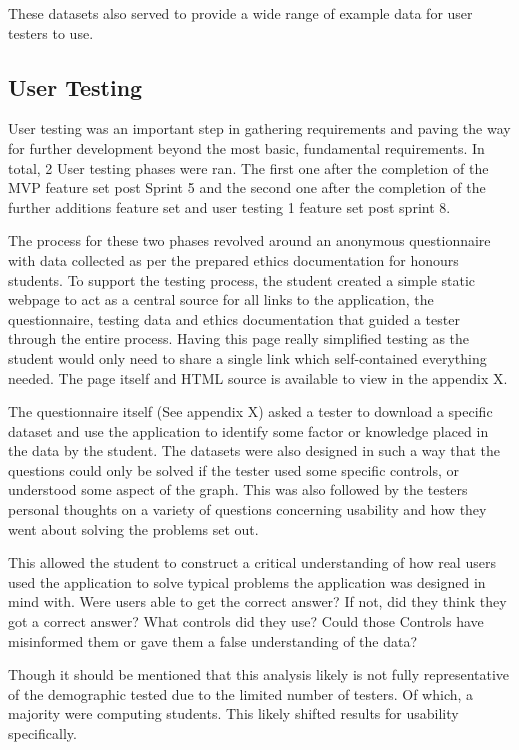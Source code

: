 These datasets also served to provide a wide range of example data for user testers to use.

\subsection{User Testing}
User testing was an important step in gathering requirements and paving the way for further development beyond the most basic, fundamental requirements. In total, 2 User testing phases were ran. The first one after the completion of the MVP feature set post Sprint 5 and the second one after the completion of the further additions feature set and user testing 1 feature set post sprint 8.

The process for these two phases revolved around an anonymous questionnaire with data collected as per the prepared ethics documentation for honours students.
To support the testing process, the student created a simple static webpage to act as a central source for all links to the application, the questionnaire, testing data and ethics documentation that guided a tester through the entire process. Having this page really simplified testing as the student would only need to share a single link which self-contained everything needed. The page itself and HTML source is available to view in the appendix X.

The questionnaire itself (See appendix X) asked a tester to download a specific dataset and use the application to identify some factor or knowledge placed in the data by the student. The datasets were also designed in such a way that the questions could only be solved if the tester used some specific controls, or understood some aspect of the graph. This was also followed by the testers personal thoughts on a variety of questions concerning usability and how they went about solving the problems set out.

This allowed the student to construct a critical understanding of how real users used the application to solve typical problems the application was designed in mind with. Were users able to get the correct answer? If not, did they think they got a correct answer? What controls did they use? Could those Controls have misinformed them or gave them a false understanding of the data?

Though it should be mentioned that this analysis likely is not fully representative of the demographic tested due to the limited number of testers. Of which, a majority were computing students. This likely shifted results for usability specifically.

